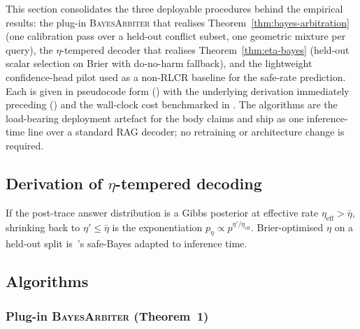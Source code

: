 This section consolidates the three deployable procedures behind the
empirical results: the plug-in \textsc{BayesArbiter} that realises
Theorem~\ref{thm:bayes-arbitration} (one calibration pass over a
held-out conflict subset, one geometric mixture per query), the
$\eta$-tempered decoder that realises
Theorem~\ref{thm:eta-bayes} (held-out scalar selection on Brier with
do-no-harm fallback), and the lightweight confidence-head pilot used
as a non-RLCR baseline for the safe-rate prediction.  Each is given
in pseudocode form () with the underlying
derivation immediately preceding ()
and the wall-clock cost benchmarked in
.  The algorithms are the load-bearing
deployment artefact for the body claims and ship as one inference-time
line over a standard RAG decoder; no retraining or architecture change
is required.

\subsection{Derivation of $\eta$-tempered decoding}
\label{app:eta-tempering-derivation}

If the post-trace answer distribution is a Gibbs posterior at
effective rate $\eta_{\mathrm{eff}}\!>\!\bar\eta$, shrinking back
to $\eta'\!\le\!\bar\eta$ is the exponentiation
$p_\eta\!\propto\!p^{\eta'/\eta_{\mathrm{eff}}}$.  Brier-optimised
$\eta$ on a held-out split is~\citet{grunwald2017}'s safe-Bayes
adapted to inference time.

\subsection{Algorithms}
\label{app:algorithms}

\subsubsection{Plug-in \textsc{BayesArbiter} (Theorem~1)}

